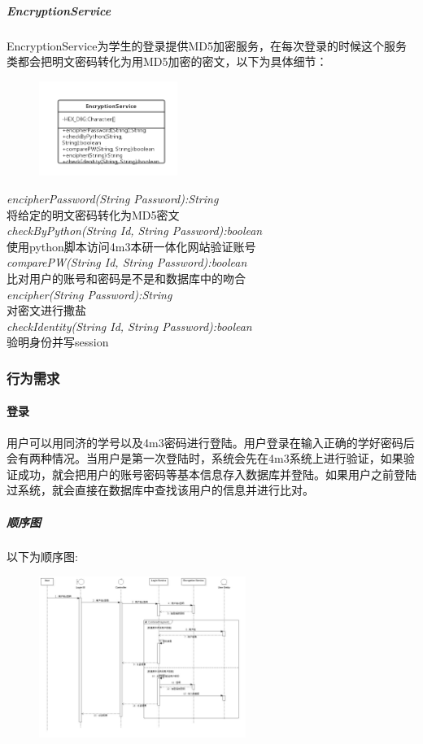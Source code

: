 \documentclass[UTF8]{ctexart}
\begin{document}
\subparagraph{EncryptionService}
EncryptionService为学生的登录提供MD5加密服务，在每次登录的时候这个服务类都会把明文密码转化为用MD5加密的密文，以下为具体细节：
\newline
\begin{figure}[H]
\centering
\includegraphics[width = 0.4\textwidth]{Encryption-rs.png}
\end{figure}
\begin{center}
\emph{encipherPassword(String Password):String}\\
将给定的明文密码转化为MD5密文\\
\emph{checkByPython(String Id, String Password):boolean}\\
使用python脚本访问4m3本研一体化网站验证账号\\
\emph{comparePW(String Id, String Password):boolean}\\
比对用户的账号和密码是不是和数据库中的吻合\\
\emph{encipher(String Password):String}\\
对密文进行撒盐\\
\emph{checkIdentity(String Id, String Password):boolean}\\
验明身份并写session
\end{center}

\subsubsection{行为需求}
\paragraph{登录}
用户可以用同济的学号以及4m3密码进行登陆。用户登录在输入正确的学好密码后会有两种情况。当用户是第一次登陆时，系统会先在4m3系统上进行验证，如果验证成功，就会把用户的账号密码等基本信息存入数据库并登陆。如果用户之前登陆过系统，就会直接在数据库中查找该用户的信息并进行比对。

\subparagraph*{顺序图}
以下为顺序图:\\
\begin{figure}[H]
\centering
\includegraphics[width = 0.6\textwidth]{loginSeq.jpg}
\end{figure}
\end{document}
